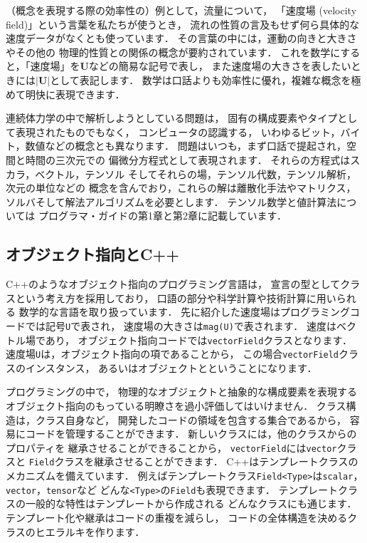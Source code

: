 （概念を表現する際の効率性の）例として，流量について，
「速度場 (velocity field)」という言葉を私たちが使うとき，
流れの性質の言及もせず何ら具体的な速度データがなくとも使っています．
その言葉の中には，運動の向きと大きさやその他の
物理的性質との関係の概念が要約されています．
これを数学にすると，「速度場」を$\bm{U}$などの簡易な記号で表し，
また速度場の大きさを表したいときには$|\bm{U}|$として表記します．
数学は口話よりも効率性に優れ，複雑な概念を極めて明快に表現できます．

連続体力学の中で解析しようとしている問題は，
固有の構成要素やタイプとして表現されたものでもなく，
コンピュータの認識する，
いわゆるビット，バイト，数値などの概念とも異なります．
問題はいつも，まず口話で提起され，空間と時間の三次元での
偏微分方程式として表現されます．
それらの方程式はスカラ，ベクトル，テンソル
そしてそれらの場，テンソル代数，テンソル解析，次元の単位などの
概念を含んでおり，これらの解は離散化手法やマトリクス，
ソルバそして解法アルゴリズムを必要とします．
テンソル数学と値計算法については
プログラマ・ガイドの第1\nobreak 章と第2\nobreak 章に記載しています．


\subsection{オブジェクト指向とC++}
\label{ssec:3.1.2}
C++のようなオブジェクト指向のプログラミング言語は，
宣言の型としてクラスという考え方を採用しており，
口語の部分や科学計算や技術計算に用いられる
数学的な言語を取り扱っています．
先に紹介した速度場はプログラミングコードでは記号\texttt{U}で表され，
速度場の大きさは\texttt{mag(U)}で表されます．
速度はベクトル場であり，
オブジェクト指向コードでは\texttt{vectorField}クラスとなります．
速度場\texttt{U}は，オブジェクト指向の項であることから，
この場合\texttt{vectorField}クラスのインスタンス，
あるいはオブジェクトとということになります．

プログラミングの中で，
物理的なオブジェクトと抽象的な構成要素を表現する
オブジェクト指向のもっている明瞭さを過小評価してはいけません．
クラス構造は，クラス自身など，
開発したコードの領域を包含する集合であるから，
容易にコードを管理することができます．
新しいクラスには，他のクラスからのプロパティを
継承させることができることから，
\texttt{vectorField}には\texttt{vector}クラスと
\texttt{Field}クラスを継承させることができます．
C++はテンプレートクラスのメカニズムを備えています．
例えばテンプレートクラス\texttt{Field<Type>}は\texttt{scalar}，
\texttt{vector}，\texttt{tensor}など
どんな\texttt{<Type>}の\texttt{Field}も表現できます．
テンプレートクラスの一般的な特性はテンプレートから作成される
どんなクラスにも通じます．
テンプレート化や継承はコードの重複を減らし，
コードの全体構造を決めるクラスのヒエラルキを作ります．


